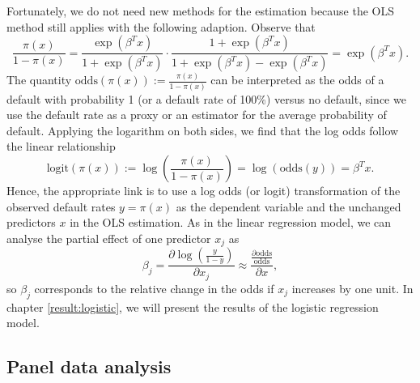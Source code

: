\documentclass[a4paper, 11pt]{scrreprt}
\newcommand{\logit}{\mathrm{logit}}
\newcommand{\odds}{\mathrm{odds}}
\begin{document}
Fortunately, we do not need new methods for the estimation because the OLS method still applies with the following adaption.
Observe that
\begin{equation}
\frac{\pi(x)}{1-\pi(x)} = \frac{\exp(\beta^T x)}{1+\exp(\beta^T x)} \cdot \frac{1+ \exp(\beta^T x)}{1 + \exp(\beta^T x) - \exp(\beta^T x)}   = \exp(\beta^T x).
\end{equation}
The quantity $\odds(\pi(x)) := \frac{\pi(x)}{1-\pi(x)}$ can be interpreted as the odds of a default with probability 1 (or a default rate of 100\%) versus no default, since we use the default rate as a proxy or an estimator for the average probability of default.
Applying the logarithm on both sides, we find that the log odds follow the linear relationship 
\begin{equation}\label{logisticreg}
\logit(\pi(x)) := \log\left(\frac{\pi(x)}{1-\pi(x)}\right) = \log(\odds(y)) = \beta^T x.
\end{equation}
Hence, the appropriate link is to use a log odds (or logit) transformation of the observed default rates $y=\pi(x)$ as the dependent variable and the unchanged predictors $x$ in the OLS estimation.
As in the linear regression model, we can analyse the partial effect of one predictor $x_j$ as
\begin{equation} 
\beta_j = \frac{\partial \log\left(\frac{y}{1-y}\right)}{\partial x_j} \approx \frac{\frac{\partial \odds}{\odds}}{\partial x},
\end{equation}
so $\beta_j$ corresponds to the relative change in the odds if $x_j$ increases by one unit.
In chapter \ref{result:logistic}, we will present the results of the logistic regression model.

\subsection{Panel data analysis}\label{par:panel}
\end{document}
